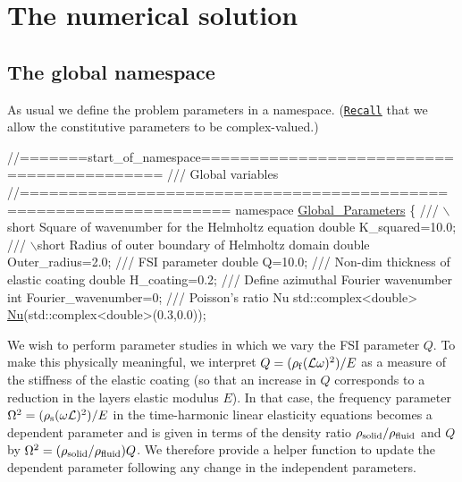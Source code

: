 \hypertarget{index_num_soln}{}\section{The numerical solution}\label{index_num_soln}
\hypertarget{index_namespace}{}\subsection{The global namespace}\label{index_namespace}
As usual we define the problem parameters in a namespace. (\href{../../../time_harmonic_fourier_decomposed_linear_elasticity/cylinder/html/index.html#comments}{\tt Recall} that we allow the constitutive parameters to be complex-\/valued.)  
\begin{DoxyCodeInclude}
\textcolor{comment}{//=======start\_of\_namespace==========================================}
\textcolor{comment}{/// Global variables}
\textcolor{comment}{}\textcolor{comment}{//===================================================================}
\textcolor{keyword}{namespace }\hyperlink{namespaceGlobal__Parameters}{Global\_Parameters}
\{
\textcolor{comment}{}
\textcolor{comment}{ /// \(\backslash\)short Square of wavenumber for the Helmholtz equation}
\textcolor{comment}{} \textcolor{keywordtype}{double} K\_squared=10.0;
 \textcolor{comment}{}
\textcolor{comment}{ /// \(\backslash\)short Radius of outer boundary of Helmholtz domain}
\textcolor{comment}{} \textcolor{keywordtype}{double} Outer\_radius=2.0; 
\textcolor{comment}{}
\textcolor{comment}{ /// FSI parameter}
\textcolor{comment}{} \textcolor{keywordtype}{double} Q=10.0;
\textcolor{comment}{}
\textcolor{comment}{ /// Non-dim thickness of elastic coating}
\textcolor{comment}{} \textcolor{keywordtype}{double} H\_coating=0.2; 
\textcolor{comment}{}
\textcolor{comment}{ /// Define azimuthal Fourier wavenumber}
\textcolor{comment}{} \textcolor{keywordtype}{int} Fourier\_wavenumber=0;
   \textcolor{comment}{}
\textcolor{comment}{ /// Poisson's ratio Nu}
\textcolor{comment}{} std::complex<double> \hyperlink{namespaceGlobal__Parameters_a373950a959cd784c8f8028099807c2fb}{Nu}(std::complex<double>(0.3,0.0));

\end{DoxyCodeInclude}


We wish to perform parameter studies in which we vary the F\+SI parameter $ Q $. To make this physically meaningful, we interpret $ Q =(\rho_{\rm f}({\cal L}\omega)^2)/E $ as a measure of the stiffness of the elastic coating (so that an increase in $ Q $ corresponds to a reduction in the layer\textquotesingle{}s elastic modulus $ E $). In that case, the frequency parameter $ \Omega^2 = (\rho_{\rm s} (\omega {\cal L})^2)/E $ in the time-\/harmonic linear elasticity equations becomes a dependent parameter and is given in terms of the density ratio $ \rho_{\rm solid}/\rho_{\rm fluid} $ and $ Q $ by $ \Omega^2 = (\rho_{\rm solid}/\rho_{\rm fluid}) Q$. We therefore provide a helper function to update the dependent parameter following any change in the independent parameters.


